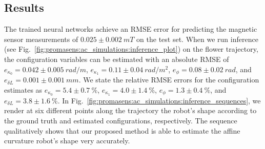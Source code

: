 \subsection{Results}\label{sub:promasens:ac_simulations:results}
The trained neural networks achieve an RMSE error for predicting the magnetic sensor measurements of $0.025 \pm 0.002 \: \si{mT}$ on the test set.
When we run inference (see Fig.~\ref{fig:promasens:ac_simulations:inference_plot}) on the flower trajectory, the configuration variables can be estimated with an absolute RMSE of $e_{\kappa_0} = 0.042 \pm 0.005 \: \si{rad \per m}$, $e_{\kappa_1} = 0.11 \pm 0.04 \: \si{rad \per m^2}$, $e_{\phi} = 0.08 \pm 0.02 \: \si{rad}$, and $e_{\delta L} = 0.001 \pm 0.001 \: \si{mm}$. 
We state the relative RMSE errors for the configuration estimates as $e_{\kappa_0} = 5.4 \pm 0.7 \: \si{\percent}$, $e_{\kappa_1} = 4.0 \pm 1.4 \: \si{\percent}$, $e_{\phi} = 1.3 \pm 0.4 \: \si{\percent}$, and $e_{\delta L} = 3.8 \pm 1.6 \: \si{\percent}$.
In Fig.~\ref{fig:promasens:ac_simulations:inference_sequences}, we render at six different points along the trajectory the robot's shape according to the ground truth and estimated configurations, respectively.
The sequence qualitatively shows that our proposed method is able to estimate the affine curvature robot's shape very accurately.
